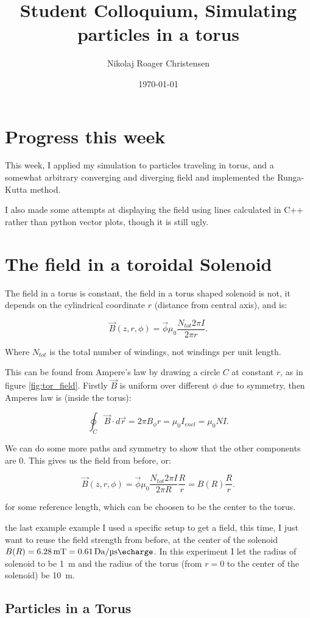 \documentclass[a4paper,12pt,article]{memoir}
\title{Student Colloquium, Simulating particles in a torus}
\author{Nikolaj Roager Christensen}
\date{\today} %
\begin{document}
\maketitle


\tableofcontents*

\chapter{Progress this week}
This week, I applied my simulation to particles traveling in torus, and a somewhat arbitrary converging and diverging field and implemented the Runga-Kutta method.

I also made some attempts at displaying the field using lines calculated in C++ rather than python vector plots, though it is still ugly.


\chapter{The field in a toroidal Solenoid}
The field in a torus is constant, the field in a torus shaped solenoid is not, it depends on the cylindrical coordinate $r$ (distance from central axis), and is:

\begin{equation}
\vec{B}(z,r,\phi)=\vec{\phi}\mu_0\frac{N_{tot} 2\pi I}{2\pi r}.
\end{equation}

Where $N_{tot}$ is the total number of windings, not windings per unit length.

This can be found from Ampere's law by drawing a circle $C$ at constant $r$, as in figure \ref{fig:tor_field}. Firstly $\vec{B}$ is uniform over different $\phi$ due to symmetry, then Amperes law is (inside the torus):

\begin{equation}
\oint_C \vec{B}\cdot d\vec{r}=2\pi B_{\phi} r = \mu_0 I_{encl} = \mu_0 N I.
\end{equation}

We can do some more paths and symmetry to show that the other components are 0. This gives us the field from before, or:


\begin{equation}
\vec{B}(z,r,\phi)=\vec{\phi}\mu_0\frac{N_{tot} 2\pi I}{2\pi R} \frac{R}{r}=B(R)\frac{R}{r}.
\end{equation}

for some reference length, which can be choosen to be the center to the torus.

the last example example I used a specific setup to get a field, this time, I just want to reuse the field strength from before, at the center of the solenoid $B(R)=\SI{6.28 }{\milli\tesla}=\SI{0.61}{\dalton\per\micro\second\echarge}$. In this experiment I let the  radius of solenoid to be \SI{1}{\meter} and the radius of the torus (from $r=0$ to the center of the solenoid) be \SI{10}{\meter}.

\section{Particles in a Torus}

\end{document}
